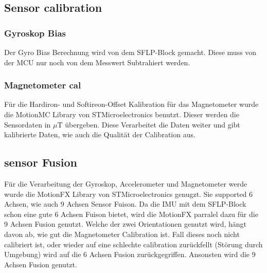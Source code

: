 \subsection{Sensor calibration} 
\subsubsection{Gyroskop Bias}
Der Gyro Bias Berechnung wird von dem SFLP-Block gemacht. Diese muss von der MCU
nur noch von dem Messwert Subtrahiert werden. 

\subsubsection{Magnetometer cal}
Für die Hardiron- und Softireon-Offset Kalibration für das Magnetometer wurde
die MotionMC Library von STMicroelectronics \cite{st_motionMC} benutzt. Dieser
werden die Sensordaten in $\mu\text{T}$ übergeben. Diese Verarbeitet die Daten 
weiter und gibt kalibrierte Daten, wie auch die Qualität der Calibration aus.


\subsection{sensor Fusion}
Für die Verarbeitung der Gyroskop, Accelerometer und Magnetometer werde wurde
die MotionFX Library von STMicroelectronics \cite{st_motionFX} genugzt. Sie
supported 6 Achsen, wie auch 9 Achsen Sensor Fuison. Da die IMU mit dem
SFLP-Block schon eine gute 6 Achsen Fuison bietet, wird die MotionFX parralel
dazu für die 9 Achsen Fusion genutzt. Welche der zwei Orientationen genutzt
wird, hängt davon ab, wie gut die Magnetometer Calibration ist. Fall dieses noch
nicht calibriert ist, oder wieder auf eine schlechte calibration zurückfellt
(Störung durch Umgebung) wird auf die 6 Achsen Fusion zurückgegriffen. Ansonsten
wird die 9 Achsen Fusion genutzt.




